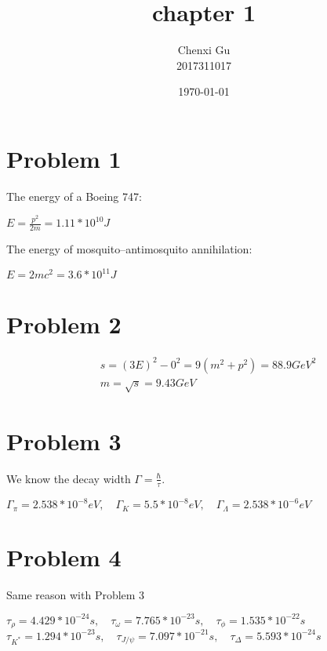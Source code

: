 \documentclass{article}
\begin{document}
\begin{CJK*}{GBK}{song}

\pagestyle{fancy}  
\fancyhead{} %
\renewcommand{\headrulewidth}{0.4pt}  
\renewcommand{\footrulewidth}{0.4pt} 



\title {chapter 1}
\author{Chenxi Gu\\2017311017}

\date{\today}

\maketitle
\section{Problem 1}
The energy of a Boeing 747:
\begin{center}
$E=\frac{p^2}{2m}=1.11*10^{10}J$
\end{center}

The energy of mosquito–antimosquito annihilation:
\begin{center}
$E=2mc^2=3.6*10^{11}J$
\end{center}

\section{Problem 2}
\begin{equation}
\begin{aligned}
&s=(3E)^2-0^2=9(m^2+p^2)=88.9GeV^2\\
&m=\sqrt{s}=9.43GeV
\end{aligned}
\end{equation}


\section{Problem 3}
We know the decay width $\Gamma=\frac{\hbar}{\tau}$.
\begin{center}
$
\Gamma_{\pi}=2.538*10^{-8}eV,\quad \Gamma_{K}=5.5*10^{-8}eV,\quad \Gamma_{\Lambda}=2.538*10^{-6}eV
$
\end{center}

\section{Problem 4}
Same reason with Problem 3
\begin{center}
$
\tau_{\rho}=4.429*10^{-24}s,\quad \tau_{\omega}=7.765*10^{-23}s,\quad \tau_{\phi}=1.535*10^{-22}s
$
$
\tau_{K^{*}}=1.294*10^{-23}s,\quad \tau_{J/\psi}=7.097*10^{-21}s,\quad\tau_{\Delta}=5.593*10^{-24}s
$
\end{center}


\end{CJK*}
\end{document}
